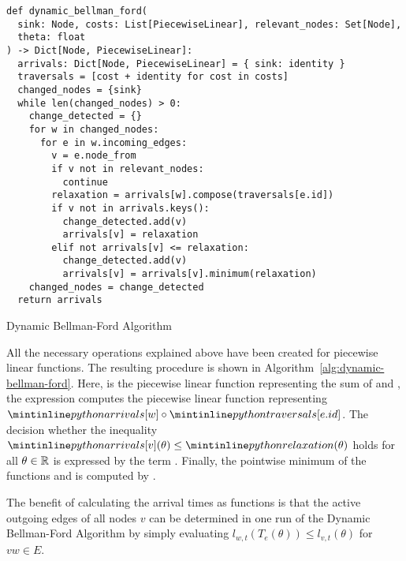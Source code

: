 \begin{algorithm}[ht]
    \begin{verbatim}
def dynamic_bellman_ford(
  sink: Node, costs: List[PiecewiseLinear], relevant_nodes: Set[Node],
  theta: float
) -> Dict[Node, PiecewiseLinear]:
  arrivals: Dict[Node, PiecewiseLinear] = { sink: identity }
  traversals = [cost + identity for cost in costs]
  changed_nodes = {sink}
  while len(changed_nodes) > 0:
    change_detected = {}
    for w in changed_nodes:
      for e in w.incoming_edges:
        v = e.node_from
        if v not in relevant_nodes:
          continue
        relaxation = arrivals[w].compose(traversals[e.id])
        if v not in arrivals.keys():
          change_detected.add(v)
          arrivals[v] = relaxation
        elif not arrivals[v] <= relaxation:
          change_detected.add(v)
          arrivals[v] = arrivals[v].minimum(relaxation)
    changed_nodes = change_detected
  return arrivals
    \end{verbatim}
    \caption{Dynamic Bellman-Ford Algorithm}
    \label{alg:dynamic-bellman-ford}
\end{algorithm}

All the necessary operations explained above have been created for piecewise linear functions.
The resulting procedure is shown in Algorithm~\ref{alg:dynamic-bellman-ford}.
Here,  is the piecewise linear function representing the sum of  and , the expression  computes the piecewise linear function representing $\code{arrivals[w]}\circ \code{traversals[e.id]}$.
The decision whether the inequality $\code{arrivals[v]}(\theta) \leq \code{relaxation}(\theta)$ holds for all $\theta \in \mathbb{R}$ is expressed by the term . 
Finally, the pointwise minimum of the functions  and  is computed by .


The benefit of calculating the arrival times as functions is that the active outgoing edges of all nodes $v$ can be determined in one run of the Dynamic Bellman-Ford Algorithm by simply evaluating $l_{w,t}(T_e(\theta)) \leq  l_{v,t}(\theta)$ for $vw\in E$.
